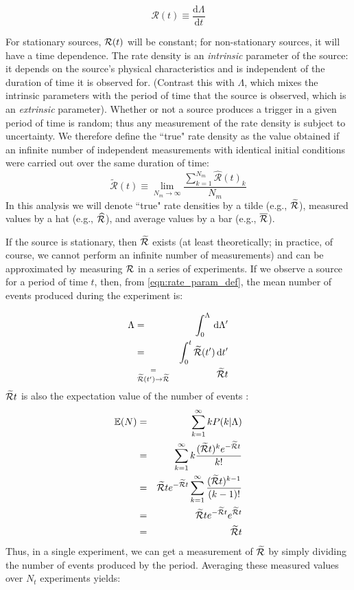 \begin{equation}
\label{eqn:rate_param_def}
\mathcal{R}(t) \equiv \frac{\mathrm{d}\Lambda}{\mathrm{d}t}
\end{equation}

For stationary sources, $\mathcal{R}(t)$ will be constant; for non-stationary sources, it will have a time dependence. The rate density is an \emph{intrinsic} parameter of the source: it depends on the source's physical characteristics and is independent of the duration of time it is observed for. (Contrast this with $\Lambda$, which mixes the intrinsic parameters with the period of time that the source is observed, which is an \emph{extrinsic} parameter). Whether or not a source produces a trigger in a given period of time is random; thus any measurement of the rate density is subject to uncertainty. We therefore define the ``true" rate density as the value obtained if an infinite number of independent measurements with identical initial conditions were carried out over the same duration of time:
\begin{equation}
\label{eqn:true_rate_param_def}
\widetilde{\mathcal{R}}(t) \equiv \lim_{N_m \to \infty} \frac{\sum_{k=1}^{N_m} \widehat{\mathcal{R}}(t)_{k}}{N_m}
\end{equation}
In this analysis we will denote ``true" rate densities by a tilde (e.g., $\widetilde{\mathcal{R}}$), measured values by a hat (e.g., $\widehat{\mathcal{R}}$), and average values by a bar (e.g., $\overline{\mathcal{R}}$).

If the source is stationary, then $\widetilde{\mathcal{R}}$ exists (at least theoretically; in practice, of course, we cannot perform an infinite number of measurements) and can be approximated by measuring $\mathcal{R}$ in a series of experiments. If we observe a source for a period of time $t$, then, from \ref{eqn:rate_param_def}, the mean number of events produced during the experiment is:

\begin{eqnarray}
\Lambda & = & \int_{0}^{\Lambda}\, \mathrm{d}\Lambda' \nonumber \\
    & = & \int_{0}^{t} \widetilde{\mathcal{R}}(t')\, \mathrm{d}t' \\
    & \stackrel{=}{_{\widetilde{\mathcal{R}}(t') \rightarrow \widetilde{\mathcal{R}}}} & \widetilde{\mathcal{R}} t
\end{eqnarray}
$\widetilde{\mathcal{R}} t$ is also the expectation value of the number of events \cite{ref:Poisson}:
\begin{eqnarray}
\mathbb{E}(N) & = & \sum_{k=1}^{\infty} k P(k|\Lambda) \nonumber \\
 & = & \sum_{k=1}^{\infty} k \frac{(\widetilde{\mathcal{R}} t)^k e^{-\widetilde{\mathcal{R}} t}}{k!} \nonumber \\
 & = & \widetilde{\mathcal{R}} t e^{-\widetilde{\mathcal{R}} t} \sum_{k=1}^{\infty} \frac{(\widetilde{\mathcal{R}} t)^{k-1}}{(k-1)!} \nonumber \\
 & = & \widetilde{\mathcal{R}} t e^{-\widetilde{\mathcal{R}} t} e^{\widetilde{\mathcal{R}} t} \nonumber \\
 & = & \widetilde{\mathcal{R}} t
\end{eqnarray}
Thus, in a single experiment, we can get a measurement of $\widetilde{\mathcal{R}}$ by simply dividing the number of events produced by the period. Averaging these measured values over $N_t$ experiments yields:

